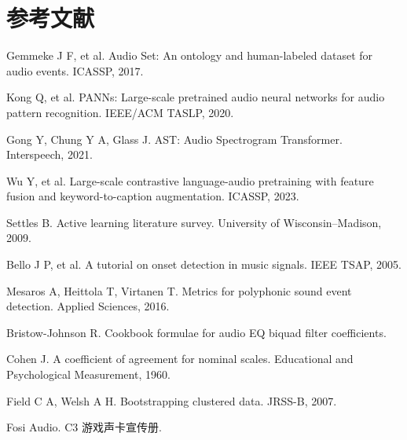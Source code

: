 \documentclass[11pt,a4paper]{ctexart}
\begin{document}
\section{参考文献}
\begin{enumerate}[label={[\arabic*]},leftmargin=2.2em]\small
\item Gemmeke J F, et al. Audio Set: An ontology and human-labeled dataset for audio events. ICASSP, 2017.
\item Kong Q, et al. PANNs: Large-scale pretrained audio neural networks for audio pattern recognition. IEEE/ACM TASLP, 2020.
\item Gong Y, Chung Y A, Glass J. AST: Audio Spectrogram Transformer. Interspeech, 2021.
\item Wu Y, et al. Large-scale contrastive language-audio pretraining with feature fusion and keyword-to-caption augmentation. ICASSP, 2023.
\item Settles B. Active learning literature survey. University of Wisconsin--Madison, 2009.
\item Bello J P, et al. A tutorial on onset detection in music signals. IEEE TSAP, 2005.
\item Mesaros A, Heittola T, Virtanen T. Metrics for polyphonic sound event detection. Applied Sciences, 2016.
\item Bristow-Johnson R. Cookbook formulae for audio EQ biquad filter coefficients.
\item Cohen J. A coefficient of agreement for nominal scales. Educational and Psychological Measurement, 1960.
\item Field C A, Welsh A H. Bootstrapping clustered data. JRSS-B, 2007.
\item Fosi Audio. C3 游戏声卡宣传册.
\end{enumerate}
\end{document}
